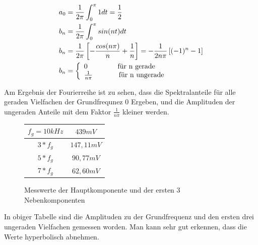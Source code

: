 \begin{center}
  \begin{align*}
    a_0 &= \frac{1}{2\pi}\int_0^{\pi} 1 dt = \frac{1}{2} \\
    b_n &= \frac{1}{2\pi}\int_0^{\pi} sin(nt) dt \\
    b_n &= \frac{1}{2\pi} \left[ -\frac{cos(n\pi)}{n} + \frac{1}{n} \right] = -\frac{1}{2n\pi} \left[ (-1)^n - 1  \right] \\
    b_n &= \left\{\begin{array}{ll}
            0              \hspace{1.5cm} \text{f\"ur n gerade}\\
            \frac{1}{n\pi} \hspace{1.3cm} \text{f\"ur n ungerade}
            \end{array}\right. \\
  \end{align*}
\end{center}
\noindent
Am Ergebnis der Fourierreihe ist zu sehen, dass die Spektralanteile f\"ur alle geraden Vielfachen der Grundfrequnez 0 Ergeben, und die Amplituden der ungeraden Anteile mit dem Faktor $\frac{1}{n\pi}$ kleiner werden.

\begin{figure}[H]
  \begin{center}
    \begin{tabular}{|c|c|} \hline
    $f_g=10kHz$ & $439mV$ \\ \hline
    $3*f_g$ & $147,11mV$ \\ \hline
    $5*f_g$ & $90,77mV$ \\ \hline
    $7*f_g$ & $62,60mV$ \\ \hline
    \end{tabular}
  \end{center}
  \caption{Messwerte der Hauptkomponente und der ersten 3 Nebenkomponenten}
\end{figure}
\noindent
In obiger Tabelle sind die Amplituden zu der Grundfrequenz und den ersten drei ungeraden Vielfachen gemessen worden. Man kann sehr gut erkennen, dass die Werte hyperbolisch abnehmen.
